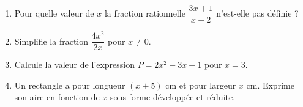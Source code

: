 \documentclass[11pt]{article}
\begin{document}
\begin{exercice}
\begin{enumerate}
\item Pour quelle valeur de $x$ la fraction rationnelle $\dfrac{3x+1}{x-2}$ n'est-elle pas définie ?
\item Simplifie la fraction $\dfrac{4x^2}{2x}$ pour $x \neq 0$.
\item Calcule la valeur de l'expression $P = 2x^2 - 3x + 1$ pour $x = 3$.
\item Un rectangle a pour longueur $(x+5)$ cm et pour largeur $x$ cm. Exprime son aire en fonction de $x$ sous forme développée et réduite.
\end{enumerate}
\end{exercice}
\end{document}
